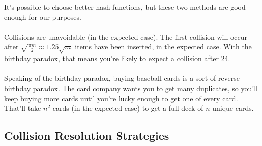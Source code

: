 \documentclass[]{article}
\theoremstyle{definition}
\begin{document}
		It's possible to choose better hash functions, but these two methods are good enough for our purposes.
		\\ \\
		Collisions are unavoidable (in the expected case). The first collision will occur after $\sqrt{\frac{\pi m}{2}} \approx 1.25 \sqrt m$ items have been inserted, in the expected case. With the birthday paradox, that means you're likely to expect a collision after 24.
		\\ \\
		Speaking of the birthday paradox, buying baseball cards is a sort of reverse birthday paradox. The card company wants you to get many duplicates, so you'll keep buying more cards until you're lucky enough to get one of every card. That'll take $n^2$ cards (in the expected case) to get a full deck of $n$ unique cards.

		\subsection{Collision Resolution Strategies}
\end{document}
